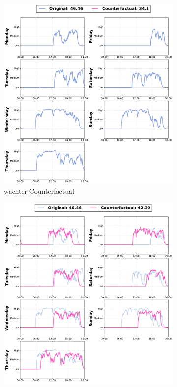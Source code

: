 \begin{figure}[h!]
     \centering
     \begin{subfigure}[b]{0.24\textwidth}
         \centering
         \includegraphics[width=\textwidth]{images/6306/0_6306_TCN_Wachter_cf.pdf}
         \caption{\gls{wachter} Counterfactual}
         \label{fig:cf:wachter}
     \end{subfigure}
     \hfill
     \begin{subfigure}[b]{0.24\textwidth}
         \centering
         \includegraphics[width=\textwidth]{images/6306/4_6306_TCN_NUN_cf.pdf}

\end{subfigure}
\end{figure}
